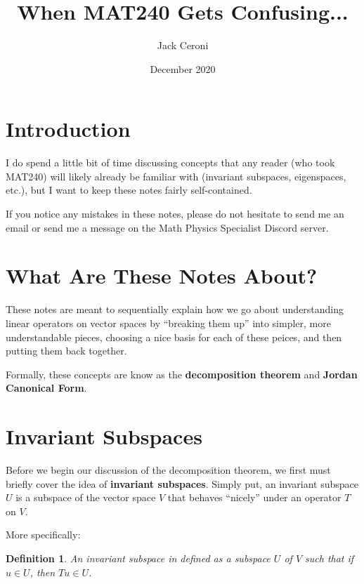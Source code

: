 \documentclass[10pt, oneside]{article}
\title{When MAT240 Gets Confusing...}
\author{Jack Ceroni}
\date{December 2020}
\newtheorem{defn}{Definition}
\begin{document}
    \maketitle
    \tableofcontents

    \vspace{.25in}

    \newpage

    \section{Introduction}

    I do spend a little bit of time discussing concepts that any reader (who took MAT240) will likely already
    be familiar with (invariant subspaces, eigenspaces, etc.), but I want to keep these notes fairly self-contained.
    \newline

    If you notice any mistakes in these notes, please do not hesitate to send me an email or
    send me a message on the Math Physics Specialist Discord server.

    \section{What Are These Notes About?}

    These notes are meant to sequentially explain how we go about understanding linear operators on vector
    spaces by ``breaking them up'' into simpler, more understandable pieces, choosing a nice basis for
    each of these peices, and then putting them back together.
    \newline

    Formally, these concepts are know as the \textbf{decomposition theorem} and \textbf{Jordan Canonical Form}.

    \section{Invariant Subspaces}

    Before we begin our discussion of the decomposition theorem, we
    first must briefly cover the idea of \textbf{invariant subspaces}.
    Simply put, an invariant subspace $U$ is a subspace
    of the vector space $V$ that behaves ``nicely'' under an operator $T$ on $V$.
    \newline

    More specifically:

    \begin{defn}
      An invariant subspace in defined as a subspace $U$ of $V$ such that if $u \in U$, then $Tu \in U$.
      \end{defn}
\end{document}
